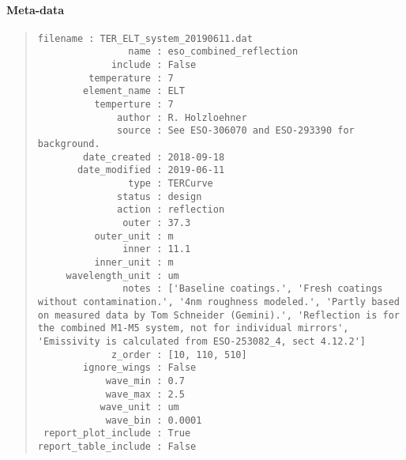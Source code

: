 \begin{figure}[H]
\noindent{}\label{fig-eso-combined-reflection}
\end{figure}


\paragraph{Meta-data%
  \label{id4}%
}

\begin{quote}
\begin{alltt}
\begin{lstlisting}[frame=single]
            filename : TER_ELT_system_20190611.dat
                name : eso_combined_reflection
             include : False
         temperature : 7
        element_name : ELT
          temperture : 7
              author : R. Holzloehner
              source : See ESO-306070 and ESO-293390 for background.
        date_created : 2018-09-18
       date_modified : 2019-06-11
                type : TERCurve
              status : design
              action : reflection
               outer : 37.3
          outer_unit : m
               inner : 11.1
          inner_unit : m
     wavelength_unit : um
               notes : ['Baseline coatings.', 'Fresh coatings without contamination.', '4nm roughness modeled.', 'Partly based on measured data by Tom Schneider (Gemini).', 'Reflection is for the combined M1-M5 system, not for individual mirrors', 'Emissivity is calculated from ESO-253082_4, sect 4.12.2']
             z_order : [10, 110, 510]
        ignore_wings : False
            wave_min : 0.7
            wave_max : 2.5
           wave_unit : um
            wave_bin : 0.0001
 report_plot_include : True
report_table_include : False
\end{lstlisting}
\end{alltt}
\end{quote}

